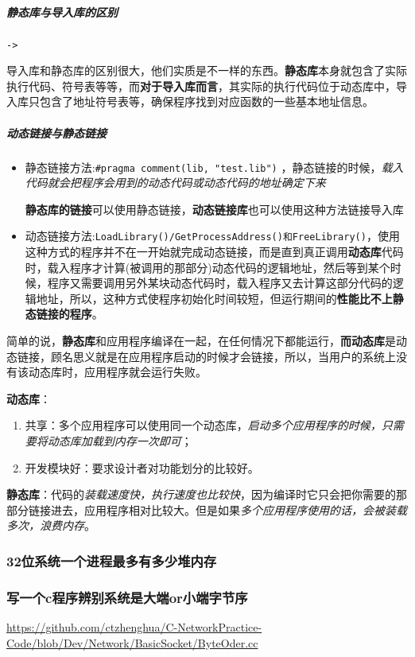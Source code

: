 \documentclass[UTF8,a4paper,8pt]{ctexart}
\begin{document}
			\subparagraph{静态库与导入库的区别}\verb|->|
			
				导入库和静态库的区别很大，他们实质是不一样的东西。\textbf{静态库}本身就包含了实际执行代码、符号表等等，而\textbf{对于导入库而言}，其实际的执行代码位于动态库中，导入库只包含了地址符号表等，确保程序找到对应函数的一些基本地址信息。
			
			\subparagraph{动态链接与静态链接}
				\begin{itemize}[itemindent = 1em]
					\item 静态链接方法:\verb|#pragma comment(lib, "test.lib")| ，静态链接的时候，\textit{载入代码就会把程序会用到的动态代码或动态代码的地址确定下来}
					
					\textbf{静态库的链接}可以使用静态链接，\textbf{动态链接库}也可以使用这种方法链接导入库
					
					\item 动态链接方法:\verb|LoadLibrary()/GetProcessAddress()和FreeLibrary()|，使用这种方式的程序并不在一开始就完成动态链接，而是直到真正调用\textbf{动态库}代码时，载入程序才计算(被调用的那部分)动态代码的逻辑地址，然后等到某个时候，程序又需要调用另外某块动态代码时，载入程序又去计算这部分代码的逻辑地址，所以，这种方式使程序初始化时间较短，但运行期间的\textbf{性能比不上静态链接的程序}。
				\end{itemize}
			
				简单的说，\textbf{静态库}和应用程序编译在一起，在任何情况下都能运行，\textbf{而动态库}是动态链接，顾名思义就是在应用程序启动的时候才会链接，所以，当用户的系统上没有该动态库时，应用程序就会运行失败。
				
				\textbf{动态库}：
				\begin{enumerate}[itemindent = 1em]
					\item 共享：多个应用程序可以使用同一个动态库，\textit{启动多个应用程序的时候，只需要将动态库加载到内存一次即可}；
					\item 开发模块好：要求设计者对功能划分的比较好。
				\end{enumerate}
				
				\textbf{静态库}：代码的\textit{装载速度快，执行速度也比较快}，因为编译时它只会把你需要的那部分链接进去，应用程序相对比较大。但是如果\textit{多个应用程序使用的话，会被装载多次，浪费内存}。
				
		\subsubsection{32位系统一个进程最多有多少堆内存}
		\subsubsection{写一个c程序辨别系统是大端or小端字节序}
			\url{https://github.com/ctzhenghua/C-NetworkPractice-Code/blob/Dev/Network/BasicSocket/ByteOder.cc}
\end{document}
